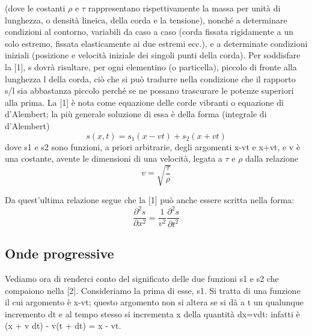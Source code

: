\documentclass[a4paper]{article}
\begin{document}
(dove le costanti $\rho$ e $\tau$ rappresentano rispettivamente la massa per unità di lunghezza, o densità lineica, della corda e la tensione), nonché a determinare condizioni al contorno, variabili da caso a caso (corda fissata rigidamente a un solo estremo, fissata elasticamente ai due estremi ecc.), e a determinate condizioni iniziali (posizione e velocità iniziale dei singoli punti della corda). Per soddisfare la [1], s dovrà risultare, per ogni elementino (o particella), piccolo di fronte alla lunghezza l della corda, ciò che si può tradurre nella condizione che il rapporto s/l sia abbastanza piccolo perché se ne possano trascurare le potenze superiori alla prima. La [1] è nota come equazione delle corde vibranti o equazione di d'Alembert; la più generale soluzione di essa è della forma (integrale di d'Alembert) 
\begin{equation}
s(x,t)=s_1(x-vt)+s_2(x+vt)
\end{equation}
dove s1 e s2 sono funzioni, a priori arbitrarie, degli argomenti x-vt e x+vt, e v è una costante, avente le dimensioni di una velocità, legata a $\tau$ e $\rho$ dalla relazione 
\begin{equation}
v=\sqrt{\frac{\tau}{\rho}}
\end{equation}

Da quest'ultima relazione segue che la [1] può anche essere scritta nella forma: 
\begin{equation}
\frac{\partial^2 s}{\partial x^2}=\frac{1}{v^2}\frac{\partial^2 s}{\partial t^2}
\end{equation}

\subsection{Onde progressive}
Vediamo ora di renderci conto del significato delle due funzioni s1 e s2 che compaiono nella [2]. Consideriamo la prima di esse, s1. Si tratta di una funzione il cui argomento è x-vt; questo argomento non si altera se si dà a t un qualunque incremento dt e al tempo stesso si incrementa x della quantità dx=vdt: infatti è (x + v dt) - v(t + dt) = x - vt.
\end{document}
